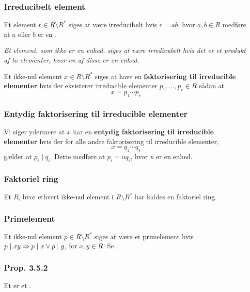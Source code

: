 \subsubsection{Irreducibelt element}
\label{Irreducibelt element}
Et element $r \in R\setminus R^*$ siges at være irreducibelt hvis $r = ab$, hvor
$a,b \in R$ medføre at $a$ eller $b$ er en .

\textit{Et element, som ikke er en enhed, siges at være irredicubelt hvis det
er et produkt af to elementer, hvor en af disse er en enhed.}

Et ikke-nul element $x \in R\setminus R^*$ siges at have en
\textbf{faktorisering til irreducible elementer} hvis der eksisterer
irreducible elementer $p_1,\ldots,p_r \in R$ sådan at
\begin{equation*}
  x = p_1 \cdots p_r
\end{equation*}

\subsubsection{Entydig faktorisering til irreducible elementer}
\label{Entydig faktorisering til irreducible elementer}
Vi siger ydermere at $x$ har en \textbf{entydig faktorisering til irreducible
elementer} hvis der for alle andre faktorisering til irreducible elementer,
\begin{equation*}
  x = q_1 \cdots q_s
\end{equation*}
gælder at $p_i \mid q_i$. Dette medføre at $p_i = uq_i$, hvor $u$ er en enhed.

\subsubsection{Faktoriel ring}
\label{Faktoriel ring}
Et  $R$, hvor ethvert ikke-nul element i $R\setminus
R^*$ har  kaldes en
faktoriel ring.

\subsubsection{Primelement}
\label{Primelement}
Et ikke-nul element $p \in R\setminus R^*$ siges at være et primelement hvis $p
\mid xy \Rightarrow p\mid x \vee p \mid y$, for $x,y \in R$. Se .

\subsubsection{Prop. 3.5.2}
\label{Prop. 3.5.2}
Et  er et .

